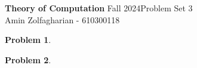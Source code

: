 \documentclass[12pt]{article}
\newcommand{\customanswer}[1]{%
\begin{problem}
\end{problem}

}
\newtheorem{problem}{Problem}
\begin{document}
\noindent \textbf{Theory of Computation} Fall 2024\hfill Problem Set 3\\
Amin Zolfagharian - 610300118

\hrulefill

\customanswer{1}
\customanswer{2}
\end{document}
